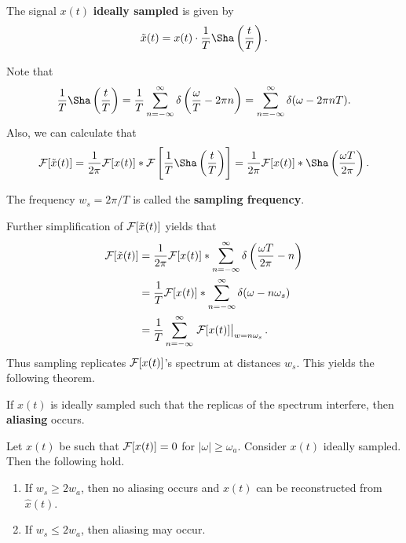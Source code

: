 \documentclass{memoir}
\begin{document}
\begin{definition}
    The signal $x(t)$ \textbf{ideally sampled} is given by
    \begin{align*}
        \tilde{x}(t) = x(t) \cdot \frac{1}{T}\Sha\left(\frac{t}{T}\right).
    \end{align*}
\end{definition}
Note that
\begin{align*}
    \frac{1}{T}\Sha\left(\frac{t}{T}\right) = \frac{1}{T} \sum_{n=-\infty}^{\infty}\delta\left(\frac{\omega}{T} - 2 \pi n\right) = \sum_{n=-\infty}^{\infty} \delta(\omega - 2 \pi n T).
\end{align*}
Also, we can calculate that
\begin{align*}
    \F[\tilde{x}(t)] = \frac{1}{2 \pi} \F[x(t)] \ast \F\left[\frac{1}{T}\Sha\left(\frac{t}{T}\right)\right] = \frac{1}{2 \pi} \F[x(t)] \ast \Sha\left(\frac{\omega T}{2 \pi}\right).
\end{align*}
\begin{definition}
    The frequency $w_s = 2 \pi / T$ is called the \textbf{sampling frequency}.
\end{definition}
Further simplification of $\mathcal{F}[\tilde{x}(t)]$ yields that
\begin{align*}
    \mathcal{F}[\tilde{x}(t)] &= \frac{1}{2 \pi} \mathcal{F}[x(t)] \ast \sum_{n=-\infty}^{\infty} \delta\left(\frac{\omega T}{2\pi} - n\right) \\
    &= \frac{1}{T} \mathcal{F}[x(t)] \ast \sum_{n=-\infty}^{\infty} \delta( \omega - n \omega_s) \\
    &= \frac{1}{T} \sum_{n=-\infty}^{\infty} \left.\mathcal{F}[x(t)]\right|_{w=n \omega_s}.
\end{align*}
Thus sampling replicates $\mathcal{F}[x(t)]$'s spectrum at distances $w_s$. This yields the following theorem.
\begin{definition}
    If $x(t)$ is ideally sampled such that the replicas of the spectrum interfere, then \textbf{aliasing} occurs.
\end{definition}
\begin{theorem}
    Let $x(t)$ be such that $\mathcal{F}[x(t)] = 0$ for $|\omega| \ge \omega_a$. Consider $x(t)$ ideally sampled. Then the following hold.
    \begin{enumerate}
        \item If $w_s \ge 2 w_a$, then no aliasing occurs and $x(t)$ can be reconstructed from $\hat{x}(t)$.
        \item If $w_s \le 2 w_a$, then aliasing may occur.
    \end{enumerate}
\end{theorem}
\end{document}
